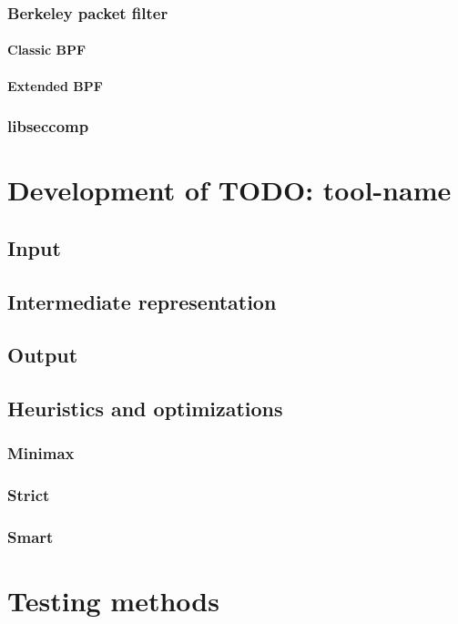 \subsection{Berkeley packet filter}
\subsubsection{Classic BPF}
\subsubsection{Extended BPF}

\subsection{libseccomp}


\chapter{Development of TODO: tool-name}
\section{Input}
\section{Intermediate representation}
\section{Output}
\section{Heuristics and optimizations}
\subsection{Minimax}
\subsection{Strict}
\subsection{Smart}


\chapter{Testing methods}


